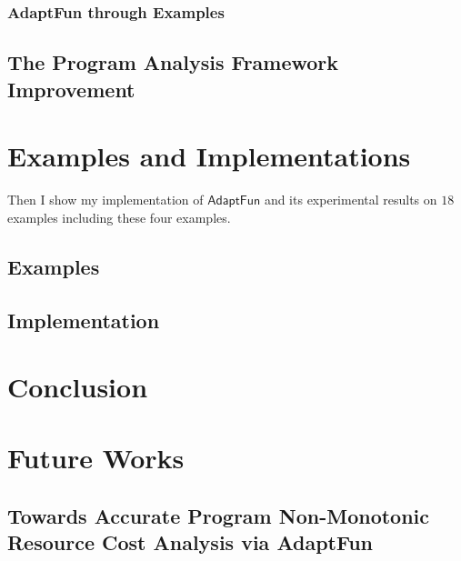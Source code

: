 \documentclass[12pt, letterpaper]{report}   %
\newcommand{\THESYSTEM}{\textsf{AdaptFun}}
\begin{document}
\subsection{{\THESYSTEM} through Examples}
\label{sec:static-examples}


\section{  The Program Analysis Framework Improvement}


\clearpage
\chapter{Examples and Implementations}
\label{sec:adapt-implementation}
Then I show my implementation of $\THESYSTEM$ and its experimental 
results on $18$ examples including these four examples.
\section{Examples}

\section{Implementation}


% 

\chapter*{}



\chapter{Conclusion}
\label{sec:conclusion}

\chapter{Future Works}
\label{sec:future}
\section{Towards Accurate Program Non-Monotonic Resource Cost Analysis via {\THESYSTEM}}
\label{ch:generalization}

\end{document}
